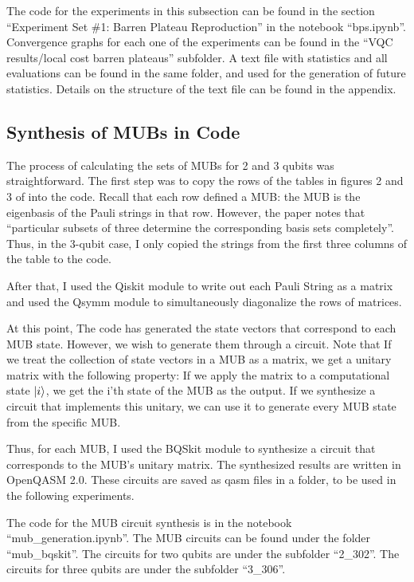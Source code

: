 \documentclass[a4paper,12pt]{article}
\begin{document}
The code for the experiments in this subsection can be found in the section ``Experiment Set \#1: Barren Plateau Reproduction'' in the notebook ``bps.ipynb''.
Convergence graphs for each one of the experiments can be found in the ``VQC results/local cost barren plateaus'' subfolder. A text file with statistics and all evaluations can be found in the same folder, and used for the generation of future statistics. Details on the structure of the text file can be found in the appendix.

\subsection{Synthesis of MUBs in Code} \label{subsec:mub_synthesis}
The process of calculating the sets of MUBs for 2 and 3 qubits was straightforward.
The first step was to copy the rows of the tables in figures 2 and 3 of \cite{lawrence_mutually_2002} into the code.
Recall that each row defined a MUB: the MUB is the eigenbasis of the Pauli strings in that row.
However, the paper notes that ``particular subsets of three determine the corresponding basis sets completely''.
Thus, in the 3-qubit case, I only copied the strings from the first three columns of the table to the code.

After that, I used the Qiskit module to write out each Pauli String as a matrix and used the Qsymm module to simultaneously diagonalize the rows of matrices.

At this point, The code has generated the state vectors that correspond to each MUB state. However, we wish to generate them through a circuit.
Note that If we treat the collection of state vectors in a MUB as a matrix, we get a unitary matrix with the following property:
If we apply the matrix to a computational state $\ket{i}$, we get the i'th state of the MUB as the output.
If we synthesize a circuit that implements this unitary, we can use it to generate every MUB state from the specific MUB.

Thus, for each MUB, I used the BQSkit module to synthesize a circuit that corresponds to the MUB's unitary matrix.
The synthesized results are written in OpenQASM 2.0.
These circuits are saved as qasm files in a folder, to be used in the following experiments.

The code for the MUB circuit synthesis is in the notebook ``mub\_generation.ipynb''.
The MUB circuits can be found under the folder ``mub\_bqskit''.
The circuits for two qubits are under the subfolder ``2\_302''. The circuits for three qubits are under the subfolder ``3\_306''.
\end{document}
